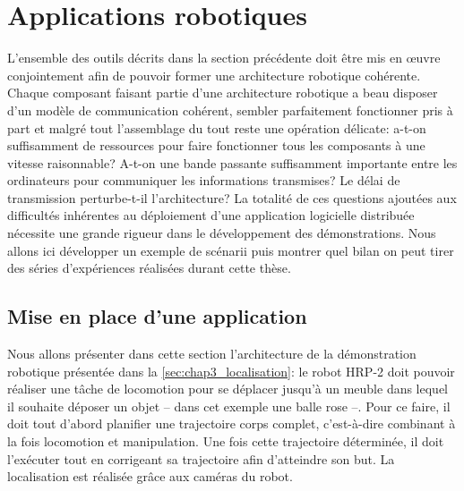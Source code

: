 \section{Applications robotiques}


L'ensemble des outils décrits dans la section précédente doit être
mis en \oe uvre conjointement afin de pouvoir former une architecture
robotique cohérente. Chaque composant faisant partie d'une
architecture robotique a beau disposer d'un modèle de communication
cohérent, sembler parfaitement fonctionner pris à part et malgré tout
l'assemblage du tout reste une opération délicate: a-t-on suffisamment
de ressources pour faire fonctionner tous les composants à une vitesse
raisonnable? A-t-on une bande passante suffisamment importante entre
les ordinateurs pour communiquer les informations transmises? Le délai
de transmission perturbe-t-il l'architecture? La totalité de ces
questions ajoutées aux difficultés inhérentes au déploiement d'une
application logicielle distribuée nécessite une grande rigueur dans le
développement des démonstrations. Nous allons ici développer un
exemple de scénarii puis montrer quel bilan on peut tirer des séries
d'expériences réalisées durant cette thèse.


\subsection{Mise en place d'une application}


Nous allons présenter dans cette section l'architecture de la
démonstration robotique présentée dans la
\autoref{sec:chap3_localisation}: le robot HRP-2 doit pouvoir réaliser
une tâche de locomotion pour se déplacer jusqu'à un meuble dans lequel
il souhaite déposer un objet -- dans cet exemple une balle rose
--. Pour ce faire, il doit tout d'abord planifier une trajectoire
corps complet, c'est-à-dire combinant à la fois locomotion et
manipulation. Une fois cette trajectoire déterminée, il doit
l'exécuter tout en corrigeant sa trajectoire afin d'atteindre son
but. La localisation est réalisée grâce aux caméras du robot.

